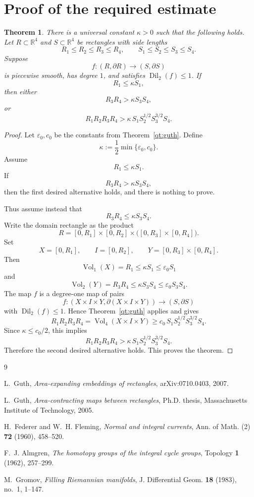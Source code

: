 \documentclass[11pt]{article}
\newtheorem{theorem}{Theorem}
\newcommand{\R}{\mathbb{R}}
\newcommand{\Vol}{\operatorname{Vol}}
\newcommand{\Dil}{\operatorname{Dil}}
\begin{document}
\section{Proof of the required estimate}

\begin{theorem}\label{thm:main}
There is a universal constant \(\kappa>0\) such that the following holds.
Let \(R\subset \R^4\) and \(S\subset \R^4\) be rectangles with side lengths
\[
R_1\leq R_2\leq R_3\leq R_4,
\qquad
S_1\leq S_2\leq S_3\leq S_4.
\]
Suppose
\[
f:(R,\partial R)\longrightarrow (S,\partial S)
\]
is piecewise smooth, has degree \(1\), and satisfies \(\Dil_2(f)\leq 1\).
If
\[
R_1\leq \kappa S_1,
\]
then either
\[
R_3R_4>\kappa S_3S_4,
\]
or
\[
R_1R_2R_3R_4
>
\kappa\,S_1S_2^{1/2}S_3^{3/2}S_4.
\]
\end{theorem}

\begin{proof}
Let \(\varepsilon_0,c_0\) be the constants from
Theorem~\ref{qt:guth}. Define
\[
\kappa:=\frac12\min\{\varepsilon_0,c_0\}.
\]
Assume
\[
R_1\leq \kappa S_1.
\]
If
\[
R_3R_4>\kappa S_3S_4,
\]
then the first desired alternative holds, and there is nothing to prove.

Thus assume instead that
\[
R_3R_4\leq \kappa S_3S_4.
\]
Write the domain rectangle as the product
\[
R=[0,R_1]\times[0,R_2]\times\bigl([0,R_3]\times[0,R_4]\bigr).
\]
Set
\[
X=[0,R_1],\qquad I=[0,R_2],\qquad
Y=[0,R_3]\times[0,R_4].
\]
Then
\[
\Vol_1(X)=R_1\leq \kappa S_1\leq \varepsilon_0S_1
\]
and
\[
\Vol_2(Y)=R_3R_4\leq \kappa S_3S_4\leq \varepsilon_0S_3S_4.
\]
The map \(f\) is a degree-one map of pairs
\[
f:(X\times I\times Y,\partial(X\times I\times Y))
\longrightarrow (S,\partial S)
\]
with \(\Dil_2(f)\leq 1\). Hence Theorem~\ref{qt:guth} applies and gives
\[
R_1R_2R_3R_4
=
\Vol_4(X\times I\times Y)
\geq
c_0\,S_1S_2^{1/2}S_3^{3/2}S_4.
\]
Since \(\kappa\leq c_0/2\), this implies
\[
R_1R_2R_3R_4
>
\kappa\,S_1S_2^{1/2}S_3^{3/2}S_4.
\]
Therefore the second desired alternative holds. This proves the theorem.
\end{proof}

\begin{thebibliography}{9}

L.~Guth,
\emph{Area-expanding embeddings of rectangles},
arXiv:0710.0403, 2007.

L.~Guth,
\emph{Area-contracting maps between rectangles},
Ph.D. thesis, Massachusetts Institute of Technology, 2005.

H.~Federer and W.~H. Fleming,
\emph{Normal and integral currents},
Ann. of Math. (2) \textbf{72} (1960), 458--520.

F.~J. Almgren,
\emph{The homotopy groups of the integral cycle groups},
Topology \textbf{1} (1962), 257--299.

M.~Gromov,
\emph{Filling Riemannian manifolds},
J. Differential Geom. \textbf{18} (1983), no.~1, 1--147.

\end{thebibliography}
\end{document}
